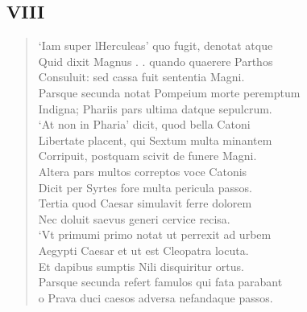 \documentclass[11pt, a4paper]{report}
\begin{document}
            \subsection*{VIII}
      \begin{verse}
      ‘Iam super lHerculeas’ quo fugit, denotat atque \\ Quid dixit  \lbrack Magnus . . quando quaerere Parthos \\ Consuluit: sed cassa fuit sententia Magni. \\ Parsque secunda notat Pompeium morte peremptum \\ Indigna; Phariis pars ultima datque sepulcrum. \\ ‘At non in Pharia’ dicit, quod bella Catoni \\ Libertate placent, qui Sextum multa minantem \\ Corripuit, postquam scivit de funere Magni. \\ Altera pars multos correptos voce Catonis \\ Dicit per Syrtes fore multa pericula passos. \\ Tertia quod Caesar simulavit ferre dolorem \\ Nec doluit saevus generi cervice recisa. \\ ‘Vt primumi primo notat ut perrexit ad urbem \\ Aegypti Caesar et ut est Cleopatra locuta. \\ Et dapibus sumptis Nili disquiritur ortus. \\ Parsque secunda refert famulos qui fata parabant \\ o Prava duci caesos adversa nefandaque passos. \\ 
      \end{verse}
  
\end{document}
